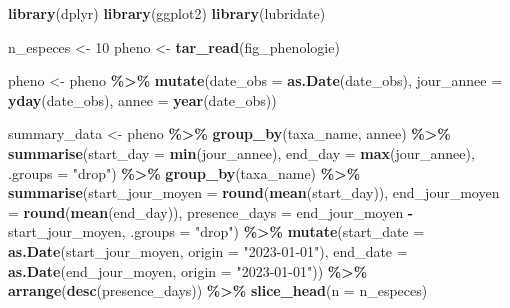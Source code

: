 \documentclass[9pt,twocolumn,twoside,]{pnas-new}
\newenvironment{Shaded}{\begin{snugshade}}{\end{snugshade}}
\newcommand{\AttributeTok}[1]{\textcolor[rgb]{0.13,0.29,0.53}{#1}}
\newcommand{\DecValTok}[1]{\textcolor[rgb]{0.00,0.00,0.81}{#1}}
\newcommand{\FunctionTok}[1]{\textcolor[rgb]{0.13,0.29,0.53}{\textbf{#1}}}
\newcommand{\NormalTok}[1]{#1}
\newcommand{\OtherTok}[1]{\textcolor[rgb]{0.56,0.35,0.01}{#1}}
\newcommand{\SpecialCharTok}[1]{\textcolor[rgb]{0.81,0.36,0.00}{\textbf{#1}}}
\newcommand{\StringTok}[1]{\textcolor[rgb]{0.31,0.60,0.02}{#1}}
\begin{document}
\begin{Shaded}
\begin{Highlighting}[]
    \FunctionTok{library}\NormalTok{(dplyr)}
    \FunctionTok{library}\NormalTok{(ggplot2)}
    \FunctionTok{library}\NormalTok{(lubridate)}

\NormalTok{n\_especes }\OtherTok{\textless{}{-}} \DecValTok{10}
\NormalTok{pheno }\OtherTok{\textless{}{-}} \FunctionTok{tar\_read}\NormalTok{(fig\_phenologie)}

\NormalTok{  pheno }\OtherTok{\textless{}{-}}\NormalTok{ pheno }\SpecialCharTok{\%\textgreater{}\%}
    \FunctionTok{mutate}\NormalTok{(}\AttributeTok{date\_obs =} \FunctionTok{as.Date}\NormalTok{(date\_obs),}
           \AttributeTok{jour\_annee =} \FunctionTok{yday}\NormalTok{(date\_obs),}
           \AttributeTok{annee =} \FunctionTok{year}\NormalTok{(date\_obs))}
  
\NormalTok{  summary\_data }\OtherTok{\textless{}{-}}\NormalTok{ pheno }\SpecialCharTok{\%\textgreater{}\%}
    \FunctionTok{group\_by}\NormalTok{(taxa\_name, annee) }\SpecialCharTok{\%\textgreater{}\%}
    \FunctionTok{summarise}\NormalTok{(}\AttributeTok{start\_day =} \FunctionTok{min}\NormalTok{(jour\_annee), }\AttributeTok{end\_day =} \FunctionTok{max}\NormalTok{(jour\_annee), }\AttributeTok{.groups =} \StringTok{"drop"}\NormalTok{) }\SpecialCharTok{\%\textgreater{}\%}
    \FunctionTok{group\_by}\NormalTok{(taxa\_name) }\SpecialCharTok{\%\textgreater{}\%}
    \FunctionTok{summarise}\NormalTok{(}\AttributeTok{start\_jour\_moyen =} \FunctionTok{round}\NormalTok{(}\FunctionTok{mean}\NormalTok{(start\_day)),}
              \AttributeTok{end\_jour\_moyen =} \FunctionTok{round}\NormalTok{(}\FunctionTok{mean}\NormalTok{(end\_day)),}
              \AttributeTok{presence\_days =}\NormalTok{ end\_jour\_moyen }\SpecialCharTok{{-}}\NormalTok{ start\_jour\_moyen,}
              \AttributeTok{.groups =} \StringTok{"drop"}\NormalTok{) }\SpecialCharTok{\%\textgreater{}\%}
    \FunctionTok{mutate}\NormalTok{(}\AttributeTok{start\_date =} \FunctionTok{as.Date}\NormalTok{(start\_jour\_moyen, }\AttributeTok{origin =} \StringTok{"2023{-}01{-}01"}\NormalTok{),}
           \AttributeTok{end\_date =} \FunctionTok{as.Date}\NormalTok{(end\_jour\_moyen, }\AttributeTok{origin =} \StringTok{"2023{-}01{-}01"}\NormalTok{)) }\SpecialCharTok{\%\textgreater{}\%}
    \FunctionTok{arrange}\NormalTok{(}\FunctionTok{desc}\NormalTok{(presence\_days)) }\SpecialCharTok{\%\textgreater{}\%}
    \FunctionTok{slice\_head}\NormalTok{(}\AttributeTok{n =}\NormalTok{ n\_especes)}
  

\end{Highlighting}
\end{Shaded}
\end{document}
